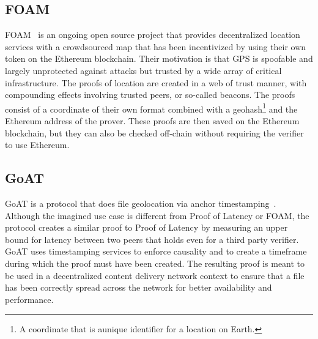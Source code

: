\subsection{FOAM}
FOAM~\cite{Foamspace_Corp2018-me} is an ongoing open source project that provides decentralized location services with a crowdsourced map that has been incentivized by using their own token on the Ethereum blockchain. Their motivation is that GPS is spoofable and largely unprotected against attacks but trusted by a wide array of critical infrastructure. The proofs of location are created in a web of trust manner, with compounding effects involving trusted peers, or so-called beacons. The proofs consist of a coordinate of their own format combined with a geohash\footnote{A coordinate that is aunique identifier for a location on Earth.} and the Ethereum address of the prover. These proofs are then saved on the Ethereum blockchain, but they can also be checked off-chain without requiring the verifier to use Ethereum.

\subsection{GoAT}
GoAT is a protocol that does file geolocation via anchor timestamping~\cite{Maram_undated-it}. Although the imagined use case is different from Proof of Latency or FOAM, the protocol creates a similar proof to Proof of Latency by measuring an upper bound for latency between two peers that holds even for a third party verifier. GoAT uses timestamping services to enforce causality and to create a timeframe during which the proof must have been created. The resulting proof is meant to be used in a decentralized content delivery network context to ensure that a file has been correctly spread across the network for better availability and performance.

